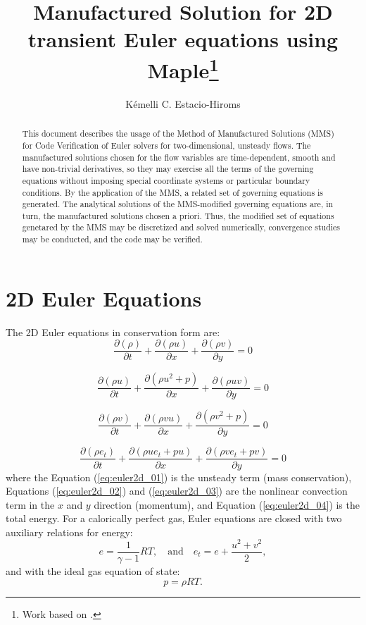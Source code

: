 \documentclass[10pt]{article}
\title{Manufactured Solution for 2D transient Euler equations using Maple\footnote{Work based on \citet*{Salari_Knupp_2000}.}}
\author{Kémelli C. Estacio-Hiroms}
\newcommand{\Diff}[2] {\dfrac{\partial( #1)}{\partial #2}}
\begin{document}
\maketitle

\begin{abstract}
This document describes the usage of the Method of Manufactured Solutions (MMS) for Code Verification of Euler solvers for two-dimensional, unsteady flows. The manufactured solutions chosen for the flow variables are time-dependent, smooth and have non-trivial derivatives, so they may exercise all the terms of the governing equations without imposing special coordinate systems or particular
boundary conditions. By the application of the MMS, a related set of governing equations is generated. The analytical solutions of the MMS-modified governing equations are, in turn, the manufactured solutions chosen a priori. %
Thus, the modified set of equations genetared by the MMS may be discretized and solved numerically, convergence studies may be conducted, and the code may be verified.
\end{abstract}


\section{2D Euler Equations}
The 2D Euler equations in conservation form are:
\begin{equation}
 \label{eq:euler2d_01}
\Diff{\rho}{t} + \Diff{\rho u}{x}+\Diff{\rho v}{y} = 0
\end{equation}


\begin{equation}
 \label{eq:euler2d_02}
\Diff{\rho u}{t} + \Diff{\rho u^2 + p}{x}+\Diff{\rho uv}{y} = 0
\end{equation}


\begin{equation}
 \label{eq:euler2d_03}
\Diff{\rho v}{t} + \Diff{\rho vu}{x}+\Diff{\rho v^2+p}{y} = 0
\end{equation}


\begin{equation}
 \label{eq:euler2d_04}
\Diff{\rho e_t}{t} + \Diff{\rho ue_t +pu}{x}+\Diff{\rho ve_t +pv}{y} = 0
\end{equation}
%
where the Equation (\ref{eq:euler2d_01}) is the unsteady term (mass conservation), Equations (\ref{eq:euler2d_02}) and (\ref{eq:euler2d_03}) are the nonlinear convection term in the $x$ and $y$ direction (momentum), and Equation (\ref{eq:euler2d_04}) is the total energy. For a calorically perfect gas,  Euler equations are closed with two auxiliary relations for energy:
\begin{equation}
 \label{eq:euler2d_05}
e=\dfrac{1}{\gamma -1}RT ,\quad\mbox{and}\quad
e_t= e+\dfrac{u^2+v^2}{2},
\end{equation}
and with the ideal gas equation of state:
\begin{equation}
 \label{eq:euler2d_07}
p=\rho RT.
\end{equation}
\end{document}

